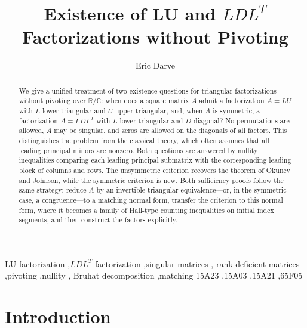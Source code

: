 \documentclass[preprint,12pt]{elsarticle}
\newcommand{\Title}{Existence of LU and $LDL^T$ Factorizations without Pivoting}
\theoremstyle{plain}
\theoremstyle{nonumberplain}
\numberwithin{equation}{section}
\numberwithin{theorem}{section}
\begin{document}
\setcounter{page}{1}

\begin{frontmatter}

  \title{\Title}

  \author{Eric Darve}

  \begin{abstract}
    We give a unified treatment of two existence questions for triangular
    factorizations without pivoting over $\mathbb{R}/\mathbb{C}$: when does a square matrix $A$ admit a factorization $A = LU$ with $L$ lower triangular and $U$ upper triangular, and, when $A$ is symmetric, a factorization $A = LDL^T$ with $L$ lower triangular and $D$ diagonal?  No permutations are allowed, $A$ may be singular, and zeros are allowed on the diagonals of all factors. This distinguishes the problem from the classical theory, which often assumes that all leading principal minors are nonzero.  Both questions are answered by nullity inequalities comparing each leading principal submatrix with the corresponding leading block of columns and rows.  The unsymmetric criterion recovers the theorem of Okunev and Johnson, while the symmetric criterion is new.  Both sufficiency proofs follow the same strategy: reduce $A$ by an invertible triangular equivalence—or, in the symmetric case, a congruence—to a matching normal form, transfer the criterion to this normal form, where it becomes a family of Hall-type counting inequalities on initial index segments, and then construct the factors explicitly.
  \end{abstract}

  \begin{keyword}
    LU factorization \sep $LDL^T$ factorization \sep singular matrices \sep
    rank-deficient matrices \sep pivoting \sep nullity \sep
    Bruhat decomposition \sep matching
    \MSC[2020] 15A23 \sep 15A03 \sep 15A21 \sep 65F05
  \end{keyword}

\end{frontmatter}


\section{Introduction}\label{sec:intro}
\end{document}
